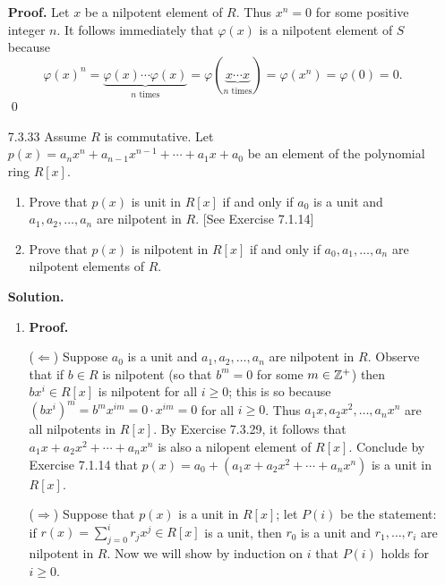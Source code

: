 \begin{enumerate}
      \textbf{Proof.} Let $x$ be a nilpotent element of $R$. Thus $x^n = 0$ for
      some positive integer $n$. It follows immediately that $\varphi(x)$ is a
      nilpotent element of $S$ because
      $$\varphi(x)^n = \underbrace{\varphi(x) \cdots
        \varphi(x)}_{n\text{ times}} =
        \varphi(\underbrace{x \cdots x}_{n \text{ times}}) = \varphi(x^n) =
        \varphi(0) = 0.$$
      \qed
   \item[7.3.33]  Assume $R$ is commutative. Let
                  $p(x) = a_nx^n + a_{n-1}x^{n-1} + \cdots + a_1x + a_0$ be an
                  element of the polynomial ring $R[x]$.
                  \begin{enumerate}
                     \item Prove that $p(x)$ is unit in $R[x]$ if and only if
                           $a_0$ is a unit and $a_1, a_2, \ldots, a_n$ are
                           nilpotent in $R$. [See Exercise 7.1.14]
                     \item Prove that $p(x)$ is nilpotent in $R[x]$ if and only
                           if $a_0, a_1, \ldots, a_n$ are nilpotent elements of
                           $R$.
                  \end{enumerate}

      \textbf{Solution.}

      \begin{enumerate}
         \item \textbf{Proof.}

               ($\Leftarrow$) Suppose $a_0$ is a unit and
               $a_1, a_2, \ldots, a_n$ are nilpotent in $R$. Observe that if
               $b \in R$ is nilpotent (so that $b^m = 0$ for some $m \in \mathbb{Z}^+$)
               then $bx^i \in R[x]$ is nilpotent for all $i \ge 0$; this is so
               because $(bx^i)^m = b^mx^{im} = 0 \cdot x^{im} = 0$ for all
               $i \ge 0$. Thus $a_1x, a_2x^2, \ldots, a_nx^n$ are all nilpotents 
               in $R[x]$. By Exercise 7.3.29, it follows that
               $a_1x+a_2x^2+\cdots+a_nx^n$ is also a nilopent element of $R[x]$. 
               Conclude by Exercise 7.1.14 that
               $p(x) = a_0 + (a_1x+a_2x^2+\cdots+a_nx^n)$ is a unit in $R[x]$.

               ($\Rightarrow$) Suppose that $p(x)$ is a unit in $R[x]$; let
               $P(i)$ be the statement: if $r(x) = \sum_{j=0}^ir_jx^j \in R[x]$ 
               is a unit, then $r_0$ is a unit and $r_1, \ldots, r_i$ are 
               nilpotent in $R$. Now we will show by induction on $i$ that
               $P(i)$ holds for $i \ge 0$.
               

\end{enumerate}
\end{enumerate}

